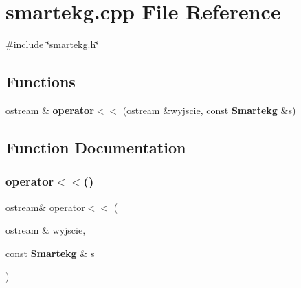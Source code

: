 \section{smartekg.\+cpp File Reference}
\label{smartekg_8cpp}
{\ttfamily \#include \char`\"{}smartekg.\+h\char`\"{}}\newline
\subsection*{Functions}
\begin{DoxyCompactItemize}
\item 
ostream \& \textbf{ operator$<$$<$} (ostream \&wyjscie, const \textbf{ Smartekg} \&s)
\end{DoxyCompactItemize}


\subsection{Function Documentation}
\mbox{\label{smartekg_8cpp_a7d76f0593b32a68a973a114a28737c0d}} 
\subsubsection{operator$<$$<$()}
{\footnotesize\ttfamily ostream\& operator$<$$<$ (\begin{DoxyParamCaption}\item[{ostream \&}]{wyjscie,  }\item[{const \textbf{ Smartekg} \&}]{s }\end{DoxyParamCaption})}

